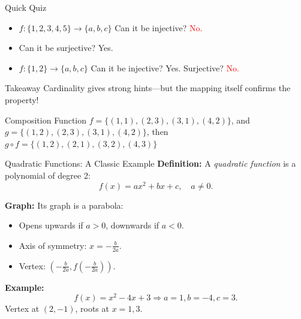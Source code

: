 \documentclass[11pt]{beamer}
\theoremstyle{plain}
\begin{document}
\begin{frame}{Quick Quiz}
\begin{itemize}
\item $f:\{1,2,3,4,5\}\to\{a,b,c\}$  
\quad Can it be injective? \textcolor{red}{No.}
\item Can it be surjective? \textcolor{green!60!black}{Yes.}
\item $f:\{1,2\}\to\{a,b,c\}$  
\quad Can it be injective? \textcolor{green!60!black}{Yes.}
\quad Surjective? \textcolor{red}{No.}
\end{itemize}

\pause
\begin{block}{Takeaway}
Cardinality gives strong hints—but the mapping itself confirms the property!
\end{block}
\end{frame}
\begin{frame}{Composition Function}
    $f = \{(1, 1), (2, 3), (3, 1), (4, 2)\}$, and $g = \{(1, 2), (2, 3), (3, 1), (4, 2)\}$, then $g \circ f = \{(1, 2), (2, 1), (3, 2), (4, 3)\}$
\end{frame}










\begin{frame}{Quadratic Functions: A Classic Example}
\textbf{Definition:}  
A \emph{quadratic function} is a polynomial of degree 2:
\[
f(x) = ax^2 + bx + c, \quad a \neq 0.
\]

\textbf{Graph:}  
Its graph is a parabola:
\begin{itemize}
    \item Opens upwards if $a > 0$, downwards if $a < 0$.
    \item Axis of symmetry: $x = -\frac{b}{2a}$.
    \item Vertex: $\left(-\frac{b}{2a}, f\!\left(-\frac{b}{2a}\right)\right)$.
\end{itemize}

\textbf{Example:}  
\[
f(x) = x^2 - 4x + 3 \Rightarrow a=1,b=-4,c=3.
\]
Vertex at $(2,-1)$, roots at $x=1,3$.
\end{frame}
\end{document}
